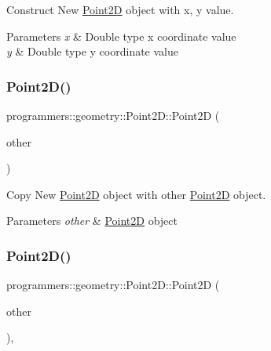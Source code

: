 Construct New \hyperlink{classprogrammers_1_1geometry_1_1Point2D}{Point2D} object with x, y value. 


\begin{DoxyParams}{Parameters}
{\em x} & Double type x coordinate value \\
\hline
{\em y} & Double type y coordinate value \\
\hline
\end{DoxyParams}
\mbox{\label{classprogrammers_1_1geometry_1_1Point2D_af02291ab4688ab64da885fa99615531e}} 
\subsubsection{\texorpdfstring{Point2\+D()}{Point2D()}\hspace{0.1cm}{\footnotesize\ttfamily [3/4]}}
{\footnotesize\ttfamily programmers\+::geometry\+::\+Point2\+D\+::\+Point2D (\begin{DoxyParamCaption}\item[{const \hyperlink{classprogrammers_1_1geometry_1_1Point2D}{Point2D} \&}]{other }\end{DoxyParamCaption})\hspace{0.3cm}{\ttfamily [default]}}



Copy New \hyperlink{classprogrammers_1_1geometry_1_1Point2D}{Point2D} object with other \hyperlink{classprogrammers_1_1geometry_1_1Point2D}{Point2D} object. 


\begin{DoxyParams}{Parameters}
{\em other} & \hyperlink{classprogrammers_1_1geometry_1_1Point2D}{Point2D} object \\
\hline
\end{DoxyParams}
\mbox{\label{classprogrammers_1_1geometry_1_1Point2D_a1ca663bb5fa5f8b18525557dc44162a2}} 
\subsubsection{\texorpdfstring{Point2\+D()}{Point2D()}\hspace{0.1cm}{\footnotesize\ttfamily [4/4]}}
{\footnotesize\ttfamily programmers\+::geometry\+::\+Point2\+D\+::\+Point2D (\begin{DoxyParamCaption}\item[{\hyperlink{classprogrammers_1_1geometry_1_1Point2D}{Point2D} \&\&}]{other }\end{DoxyParamCaption})\hspace{0.3cm}{\ttfamily [default]}, {\ttfamily [noexcept]}}



